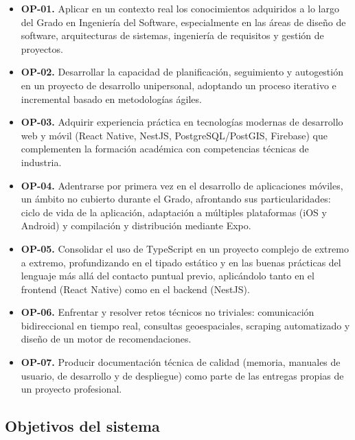 \begin{itemize}
    \item {}\label{op:01}\textbf{OP-01.} Aplicar en un contexto real los conocimientos adquiridos a lo largo del Grado en Ingeniería del Software, especialmente en las áreas de diseño de software, arquitecturas de sistemas, ingeniería de requisitos y gestión de proyectos.

    \item {}\label{op:02}\textbf{OP-02.} Desarrollar la capacidad de planificación, seguimiento y autogestión en un proyecto de desarrollo unipersonal, adoptando un proceso iterativo e incremental basado en metodologías ágiles.

    \item {}\label{op:03}\textbf{OP-03.} Adquirir experiencia práctica en tecnologías modernas de desarrollo web y móvil (React Native, NestJS, PostgreSQL/PostGIS, Firebase) que complementen la formación académica con competencias técnicas de industria.

    \item {}\label{op:04}\textbf{OP-04.} Adentrarse por primera vez en el desarrollo de aplicaciones móviles, un ámbito no cubierto durante el Grado, afrontando sus particularidades: ciclo de vida de la aplicación, adaptación a múltiples plataformas (iOS y Android) y compilación y distribución mediante Expo.

    \item {}\label{op:05}\textbf{OP-05.} Consolidar el uso de TypeScript en un proyecto complejo de extremo a extremo, profundizando en el tipado estático y en las buenas prácticas del lenguaje más allá del contacto puntual previo, aplicándolo tanto en el frontend (React Native) como en el backend (NestJS).

    \item {}\label{op:06}\textbf{OP-06.} Enfrentar y resolver retos técnicos no triviales: comunicación bidireccional en tiempo real, consultas geoespaciales, scraping automatizado y diseño de un motor de recomendaciones.

    \item {}\label{op:07}\textbf{OP-07.} Producir documentación técnica de calidad (memoria, manuales de usuario, de desarrollo y de despliegue) como parte de las entregas propias de un proyecto profesional.
\end{itemize}

\subsection{Objetivos del sistema}\label{sec:objetivos_sistema}

